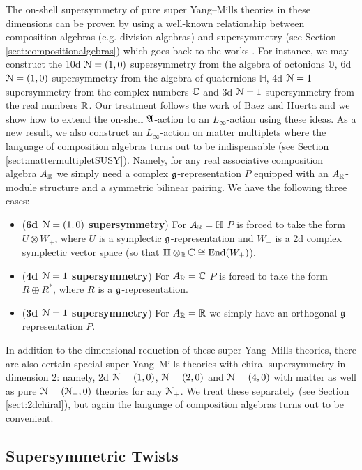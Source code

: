 \documentclass[10pt, oneside]{article}
\begin{document}
The on-shell supersymmetry of pure super Yang--Mills theories in these dimensions can be proven by using a well-known relationship between composition algebras (e.g. division algebras) and supersymmetry (see Section \ref{sect:compositionalgebras}) which goes back to the works \cite{Evans,KugoTownsend}. For instance, we may construct the 10d $\mathcal N=(1, 0)$ supersymmetry from the algebra of octonions $\mathbb{O}$, 6d $\mathcal N=(1, 0)$ supersymmetry from the algebra of quaternions $\mathbb{H}$, 4d $\mathcal N=1$ supersymmetry from the complex numbers $\mathbb C$ and 3d $\mathcal N=1$ supersymmetry from the real numbers $\mathbb R$. Our treatment follows the work of Baez and Huerta \cite{BaezHuerta} and we show how to extend the on-shell $\mathfrak A$-action to an $L_\infty$-action using these ideas. As a new result, we also construct an $L_\infty$-action on matter multiplets where the language of composition algebras turns out to be indispensable (see Section \ref{sect:mattermultipletSUSY}). Namely, for any real associative composition algebra $A_\mathbb R$ we simply need a complex $\mathfrak g$-representation $P$ equipped with an $A_\mathbb R$-module structure and a symmetric bilinear pairing. We have the following three cases:
\begin{itemize}
\item (\textbf{6d $\mathcal N=(1, 0)$ supersymmetry}) For $A_\mathbb R=\mathbb{H}$ $P$ is forced to take the form $U\otimes W_+$, where $U$ is a symplectic $\mathfrak g$-representation and $W_+$ is a 2d complex symplectic vector space (so that $\mathbb{H}\otimes_\mathbb R\mathbb C\cong \operatorname{End}(W_+)$).
\item (\textbf{4d $\mathcal N=1$ supersymmetry}) For $A_\mathbb R=\mathbb{C}$ $P$ is forced to take the form $R\oplus R^*$, where $R$ is a $\mathfrak g$-representation.
\item (\textbf{3d $\mathcal N=1$ supersymmetry}) For $A_\mathbb R=\mathbb{R}$ we simply have an orthogonal $\mathfrak g$-representation $P$.
\end{itemize}

In addition to the dimensional reduction of these super Yang--Mills theories, there are also certain special super Yang--Mills theories with chiral supersymmetry in dimension 2: namely, 2d $\mathcal N=(1, 0)$, $\mathcal N=(2, 0)$ and $\mathcal N=(4, 0)$ with matter as well as pure $\mathcal N=(\mathcal N_+, 0)$ theories for any $\mathcal N_+$. We treat these separately (see Section \ref{sect:2dchiral}), but again the language of composition algebras turns out to be convenient.

\subsection*{Supersymmetric Twists}
\end{document}
